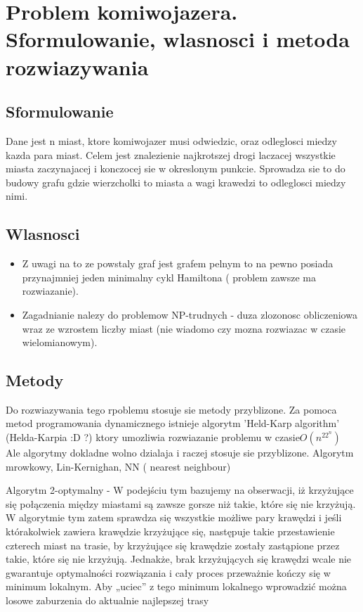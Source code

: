 \section{Problem komiwojazera. Sformulowanie, wlasnosci i metoda rozwiazywania}

\subsection{Sformulowanie}
Dane jest n miast, ktore komiwojazer musi odwiedzic, oraz odleglosci miedzy kazda para miast. Celem jest znalezienie najkrotszej drogi laczacej wszystkie miasta zaczynajacej i konczocej sie w okreslonym punkcie. Sprowadza sie to do budowy grafu gdzie wierzcholki to miasta a wagi krawedzi to odleglosci miedzy nimi.
\subsection{Wlasnosci}
\begin{itemize}
\item Z uwagi na to ze powstaly graf jest grafem pelnym to na pewno posiada przynajmniej jeden minimalny cykl Hamiltona ( problem zawsze ma rozwiazanie).
\item Zagadnianie nalezy do problemow NP-trudnych - duza zlozonosc obliczeniowa wraz ze wzrostem liczby miast (nie wiadomo czy mozna rozwiazac w czasie wielomianowym).
\end{itemize}


\subsection{Metody}
Do rozwiazywania tego rpoblemu stosuje sie metody przyblizone.
Za pomoca metod programowania dynamicznego istnieje algorytm 'Held-Karp algorithm' (Helda-Karpia :D ?) ktory umozliwia rozwiazanie problemu w czasie$ O(n^22^n)$
\\ Ale algorytmy dokladne wolno dzialaja i raczej stosuje sie przyblizone. Algorytm mrowkowy, Lin-Kernighan, NN ( nearest neighbour)

Algorytm 2-optymalny - W podejściu tym bazujemy na obserwacji, iż krzyżujące się połączenia między miastami są zawsze gorsze niż takie, które się nie krzyżują.
W algorytmie tym zatem sprawdza się wszystkie możliwe pary krawędzi i jeśli którakolwiek
zawiera krawędzie krzyżujące się, następuje takie przestawienie czterech miast na trasie, by
krzyżujące się krawędzie zostały zastąpione przez takie, które się nie krzyżują. Jednakże, brak
krzyżujących się krawędzi wcale nie gwarantuje optymalności rozwiązania i cały proces
przeważnie kończy się w minimum lokalnym. Aby „uciec” z tego minimum lokalnego
wprowadzić można losowe zaburzenia do aktualnie najlepszej trasy 

